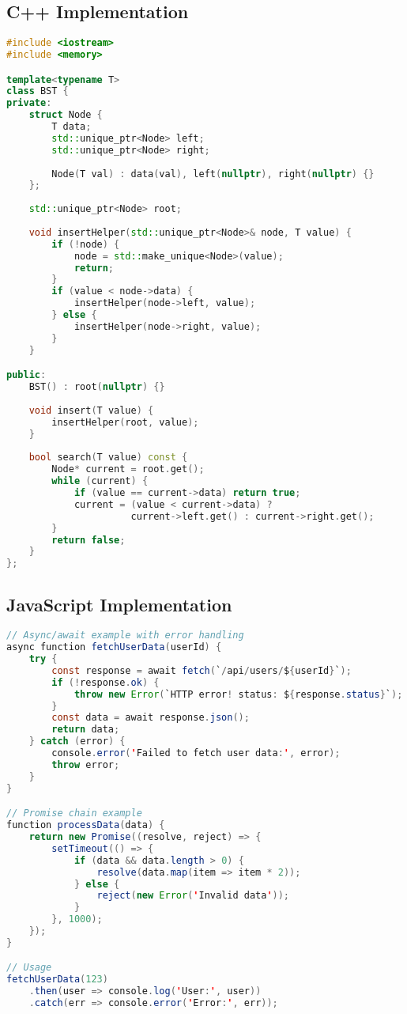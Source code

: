 \documentclass[11pt,a4paper]{article}
\theoremstyle{definition}
\begin{document}
\subsection{C++ Implementation}

\begin{lstlisting}[language=C++, caption=Binary Search Tree in C++]
#include <iostream>
#include <memory>

template<typename T>
class BST {
private:
    struct Node {
        T data;
        std::unique_ptr<Node> left;
        std::unique_ptr<Node> right;
        
        Node(T val) : data(val), left(nullptr), right(nullptr) {}
    };
    
    std::unique_ptr<Node> root;
    
    void insertHelper(std::unique_ptr<Node>& node, T value) {
        if (!node) {
            node = std::make_unique<Node>(value);
            return;
        }
        if (value < node->data) {
            insertHelper(node->left, value);
        } else {
            insertHelper(node->right, value);
        }
    }

public:
    BST() : root(nullptr) {}
    
    void insert(T value) {
        insertHelper(root, value);
    }
    
    bool search(T value) const {
        Node* current = root.get();
        while (current) {
            if (value == current->data) return true;
            current = (value < current->data) ? 
                      current->left.get() : current->right.get();
        }
        return false;
    }
};
\end{lstlisting}

\subsection{JavaScript Implementation}

\begin{lstlisting}[language=Java, caption=Promises and Async in JavaScript]
// Async/await example with error handling
async function fetchUserData(userId) {
    try {
        const response = await fetch(`/api/users/${userId}`);
        if (!response.ok) {
            throw new Error(`HTTP error! status: ${response.status}`);
        }
        const data = await response.json();
        return data;
    } catch (error) {
        console.error('Failed to fetch user data:', error);
        throw error;
    }
}

// Promise chain example
function processData(data) {
    return new Promise((resolve, reject) => {
        setTimeout(() => {
            if (data && data.length > 0) {
                resolve(data.map(item => item * 2));
            } else {
                reject(new Error('Invalid data'));
            }
        }, 1000);
    });
}

// Usage
fetchUserData(123)
    .then(user => console.log('User:', user))
    .catch(err => console.error('Error:', err));
\end{lstlisting}
\end{document}
